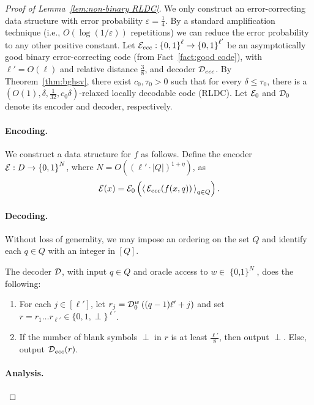 \documentclass[11pt,english]{article}
\theoremstyle{definition}
\theoremstyle{remark}
\newcommand{\eps}{\varepsilon}
\newcommand{\D}{{\cal D}}
\newcommand{\E}{{\cal E}}
\newcommand{\cube}{\operatorname{\{0, 1\}}}
\begin{document}
\begin{proof}[Proof of Lemma~\ref{lem:non-binary RLDC}]
We only construct an error-correcting data structure with error probability $\eps=\frac{1}{4}$.
By a standard amplification technique (i.e., $O(\log(1/\eps))$ repetitions)
we can reduce the error probability to any other positive constant.
Let $\E_{ecc}:\cube^{\ell}\rightarrow\cube^{\ell'}$ be an asymptotically
good binary error-correcting code (from Fact~\ref{fact:good code}),
with $\ell'=O(\ell)$ and relative distance $\frac{3}{8}$, and decoder
$\D_{ecc}$. By Theorem~\ref{thm:bghsv}, there exist $c_{0},\tau_{0}>0$
such that for every $\delta\leq\tau_{0}$, there is a $(O(1),\delta,\frac{1}{32},c_{0}\delta)$-relaxed locally decodable code (RLDC).
Let $\E_{0}$ and $\D_{0}$ denote its encoder and decoder, respectively. 


\paragraph{\textbf{Encoding.}}

We construct a data structure for $f$ as follows. Define the encoder
$\E:D\rightarrow\cube^{N}$, where $N=O(\left(\ell'\cdot|Q|\right)^{1+\eta})$,
as \[
\E(x)=\E_{0}\left(\left\langle \,\E_{ecc}(f(x,q))\,\right\rangle _{q\in Q}\right).\]

\paragraph{\textbf{Decoding.}}

Without loss of generality, we may impose an ordering on the set $Q$
and identify each $q\in Q$ with an integer in $[Q]$.

The decoder $\D$, with input $q\in Q$ and oracle access to $w\in\cube^{N}$,
does the following: 
\begin{enumerate}
\item For each $j\in[\ell']$, let $r_{j}=\D_{0}^{w}\left((q-1)\ell'+j\right)$
and set $r=r_{1}\ldots r_{\ell'}\in\{0,1,\perp\}^{\ell'}$. 
\item If the number of blank symbols $\perp$ in $r$ is at least $\frac{\ell'}{8}$,
then output $\perp$. Else, output $\D_{ecc}(r)$. 
\end{enumerate}

\paragraph{\textbf{Analysis.}}


\end{proof}
\end{document}
